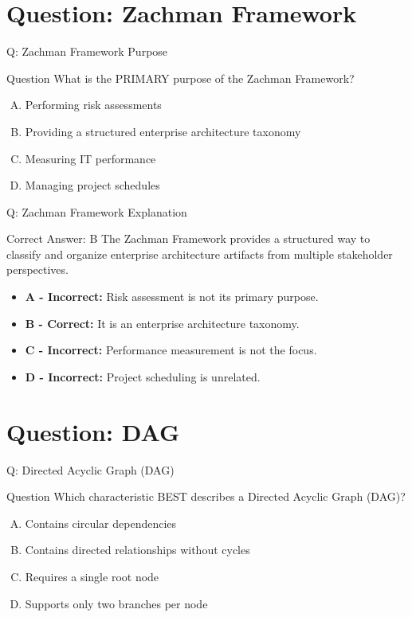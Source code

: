 \documentclass{beamer}
\begin{document}
	
	
	\section{Question: Zachman Framework}
	
	\begin{frame}{Q: Zachman Framework Purpose}
		\begin{block}{Question}
			What is the PRIMARY purpose of the Zachman Framework?
		\end{block}
		
		\begin{enumerate}[(A)]
			\item Performing risk assessments
			\item Providing a structured enterprise architecture taxonomy
			\item Measuring IT performance
			\item Managing project schedules
		\end{enumerate}
	\end{frame}
	
	\begin{frame}{Q: Zachman Framework Explanation}
		\begin{block}{Correct Answer: B}
			The Zachman Framework provides a structured way to classify
			and organize enterprise architecture artifacts from multiple
			stakeholder perspectives.
		\end{block}
		
		\begin{itemize}
			\item \textbf{A - Incorrect:} Risk assessment is not its primary purpose.
			\item \textbf{B - Correct:} It is an enterprise architecture taxonomy.
			\item \textbf{C - Incorrect:} Performance measurement is not the focus.
			\item \textbf{D - Incorrect:} Project scheduling is unrelated.
		\end{itemize}
	\end{frame}
	
	\section{Question: DAG}
	
	\begin{frame}{Q: Directed Acyclic Graph (DAG)}
		\begin{block}{Question}
			Which characteristic BEST describes a Directed Acyclic Graph (DAG)?
		\end{block}
		
		\begin{enumerate}[(A)]
			\item Contains circular dependencies
			\item Contains directed relationships without cycles
			\item Requires a single root node
			\item Supports only two branches per node
		\end{enumerate}
	\end{frame}
	
\end{document}
